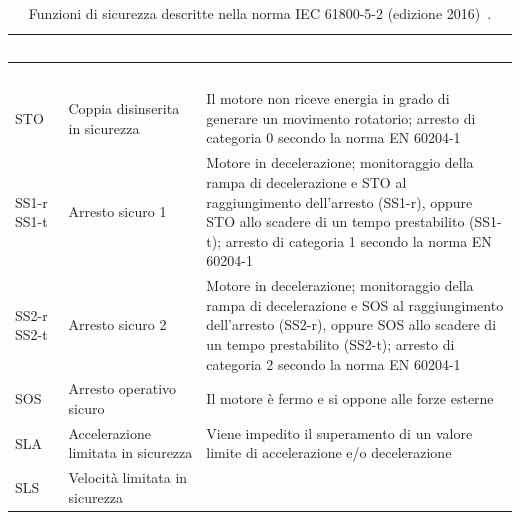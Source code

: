 \begingroup
{}
\fontsize{9}{11}\selectfont
\setlength{\tabcolsep}{4pt}
\renewcommand{\arraystretch}{1.2}
\setlength{\LTcapwidth}{\textwidth}
\begin{longtable}{|p{1.8cm}|p{4.2cm}|p{\dimexpr\textwidth-6cm-6\tabcolsep-5\arrayrulewidth\relax}|}
    \caption[Funzioni di sicurezza descritte nella norma IEC 61800-5-2 (edizione 2016)]{Funzioni di sicurezza descritte nella norma IEC 61800-5-2 (edizione 2016)~\cite{iec61800-5-2}.}
    \label{tab:05-2} \\
    \hline
    \rowcolor{tabblue}
    \textcolor{white}{\textbf{Sigla}} & \textcolor{white}{\textbf{Denominazione}} & \textcolor{white}{\textbf{Funzione}} \\
    \hline
    \endfirsthead
    \hline
    \rowcolor{tabblue}
    \textcolor{white}{\textbf{Sigla}} & \textcolor{white}{\textbf{Denominazione}} & \textcolor{white}{\textbf{Funzione}} \\
    \hline
    \endhead
    \hline
    \endfoot
    \rowcolor{black!8}
    STO & Coppia disinserita in sicurezza &
    Il motore non riceve energia in grado di generare un movimento rotatorio; arresto di categoria 0 secondo la norma EN 60204-1 \\
    \hline
    SS1-r \newline SS1-t & Arresto sicuro 1 &
    Motore in decelerazione; monitoraggio della rampa di decelerazione e STO al raggiungimento dell'arresto (SS1-r), oppure STO allo scadere di un tempo prestabilito (SS1-t); arresto di categoria 1 secondo la norma EN 60204-1 \\
    \hline
    \rowcolor{black!8}
    SS2-r \newline SS2-t & Arresto sicuro 2 &
    Motore in decelerazione; monitoraggio della rampa di decelerazione e SOS al raggiungimento dell'arresto (SS2-r), oppure SOS allo scadere di un tempo prestabilito (SS2-t); arresto di categoria 2 secondo la norma EN 60204-1 \\
    \hline
    SOS & Arresto operativo sicuro &
    Il motore è fermo e si oppone alle forze esterne \\
    \hline
    \rowcolor{black!8}
    SLA & Accelerazione limitata in sicurezza &
    Viene impedito il superamento di un valore limite di accelerazione e/o decelerazione \\
    \hline
    SLS & Velocità limitata in sicurezza &

\end{longtable}
